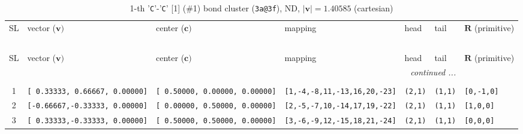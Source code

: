 \documentclass[fleqn,10pt,landscape]{jsarticle}
\begin{document}
\renewcommand{\arraystretch}{1.6}
\begin{longtable}[l]{cllllll}
\captionsetup{justification=raggedright, singlelinecheck=off}
\caption{1-th '\texttt{C}'-'\texttt{C}' [1] (\#1) bond cluster (\texttt{3a@3f}), ND, $|\bm{v}|=1.40585$ (cartesian)}
 \\
 \hline \hline
SL & vector ($\bm{v})$ & center ($\bm{c})$ & mapping & head & tail & $\bm{R}$ (primitive) \\ \hline \endfirsthead

\multicolumn{6}{l}{\tablename\ \thetable{}} \\
 \hline \hline
SL & vector ($\bm{v})$ & center ($\bm{c})$ & mapping & head & tail & $\bm{R}$ (primitive) \\ \hline \endhead

 \hline \hline
\multicolumn{6}{r}{\footnotesize\it continued ...} \\ \endfoot

 \hline \hline
\multicolumn{6}{r}{} \\ \endlastfoot

1 & \texttt{[ 0.33333, 0.66667, 0.00000]} & \texttt{[ 0.50000, 0.00000, 0.00000]} & \texttt{[1,-4,-8,11,-13,16,20,-23]} & \texttt{(2,1)} & \texttt{(1,1)} & \texttt{[0,-1,0]} \\ \hline
2 & \texttt{[-0.66667,-0.33333, 0.00000]} & \texttt{[ 0.00000, 0.50000, 0.00000]} & \texttt{[2,-5,-7,10,-14,17,19,-22]} & \texttt{(2,1)} & \texttt{(1,1)} & \texttt{[1,0,0]} \\ \hline
3 & \texttt{[ 0.33333,-0.33333, 0.00000]} & \texttt{[ 0.50000, 0.50000, 0.00000]} & \texttt{[3,-6,-9,12,-15,18,21,-24]} & \texttt{(2,1)} & \texttt{(1,1)} & \texttt{[0,0,0]} \\
\end{longtable}
\renewcommand{\arraystretch}{1.6}
\end{document}
